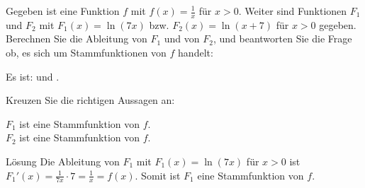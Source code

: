 \begin{MExercises}
%

\begin{MExercise}
Gegeben ist eine Funktion $f$ mit $f(x) = \frac{1}{x}$ für $x > 0$.
Weiter sind Funktionen $F_1$ und $F_2$ mit 
$F_1(x) = \ln(7x)$ bzw. $F_2(x) = \ln(x + 7)$ für $x > 0$ gegeben.
Berechnen Sie die Ableitung von $F_1$ und von $F_2$, und beantworten Sie die 
Frage ob, es sich um Stammfunktionen von $f$ handelt:

Es ist: 
und 
 . 

Kreuzen Sie die richtigen Aussagen an:
\par
\begin{MQuestionGroup}
 $F_1$ ist eine Stammfunktion von $f$.\ \\
 $F_2$ ist eine Stammfunktion von $f$.\ \\
\end{MQuestionGroup}
\par
{}

\begin{MHint}{Lösung}
Die Ableitung von $F_1$ mit $F_1(x) = \ln(7 x)$ für $x > 0$ ist
$F_1'(x) = \frac{1}{7 x} \cdot 7 = \frac{1}{x} = f(x)$. Somit ist $F_1$ eine 
Stammfunktion von $f$.


\end{MHint}
\end{MExercise}
\end{MExercises}
